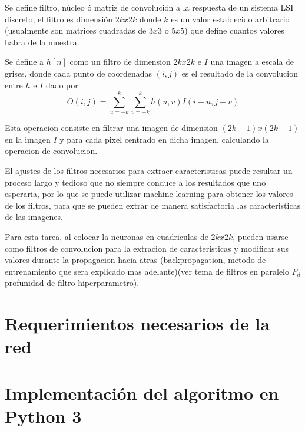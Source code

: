 Se define filtro, núcleo ó matriz de convolución a la respuesta de un sistema LSI discreto, el filtro es dimensión $2k x 2k$ donde $k$ es un 
valor establecido arbitrario (usualmente son matrices cuadradas de $3x3$ o $5x5$) que define cuantos valores habra de la muestra.

Se define a $h[n]$ como un filtro de dimension $2k x 2k$ e $I$ una imagen a escala de grises, donde cada punto de coordenadas $(i,j)$ es el 
resultado de la convolucion entre $h$ e $I$ dado por
\begin{equation}
    O(i,j)= \sum_{u=-k}^{k} \sum_{v=-k}^{k} h(u,v)I(i-u,j-v)
\end{equation}

Esta operacion consiste en filtrar una imagen de dimension $(2k+1)x(2k+1)$ en la imagen $I$ y para cada pixel centrado en dicha imagen, 
calculando la operacion de convolucion.

El ajustes de los filtros necesarios para extraer caracteristicas puede resultar un proceso largo y tedioso que no siempre conduce a los 
resultados que uno esperaria, por lo que se puede utilizar machine learning para obtener los valores de los filtros, 
para que se pueden extrar de manera satisfactoria las caracteristicas de las imagenes.

Para esta tarea, al colocar la neuronas en cuadriculas de $2k x 2k$, pueden usarse como filtros de convolucion para 
la extracion de caracteristicas y modificar sus valores durante la propagacion hacia atras (backpropagation, metodo de entrenamiento 
que sera explicado mas adelante)(ver tema de filtros en paralelo $F_d$ profunidad de filtro hiperparametro).




\section{Requerimientos necesarios de la red}

\section{Implementación del algoritmo en Python 3}
